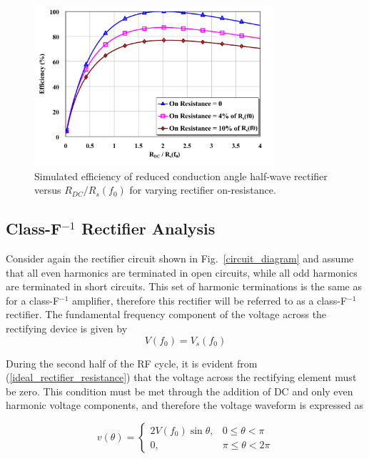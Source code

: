 \documentclass[journal]{IEEEtran}
\begin{document}
\begin{figure}
  \begin{center}
  \includegraphics[width=3.5in]{pdf/03.pdf}
  \caption{Simulated efficiency of reduced conduction angle half-wave rectifier versus $R_{DC} / R_s(f_0)$ for varying rectifier on-resistance.}\label{sim_opt_eff}
  \end{center}
\end{figure}










\subsection {Class-F$^{-1}$ Rectifier Analysis}

Consider again the rectifier circuit shown in Fig.~\ref{circuit_diagram} and assume that all even harmonics are terminated in open circuits, while all odd harmonics are terminated in short circuits. This set of harmonic terminations is the same as for a class-F$^{-1}$ amplifier, therefore this rectifier will be referred to as a class-F$^{-1}$ rectifier. The fundamental frequency component of the voltage across the rectifying device is given by
\begin{equation}\label{fundamental_diode_voltage}
    V(f_0) = V_s(f_0)
\end{equation}

During the second half of the RF cycle, it is evident from (\ref{ideal_rectifier_resistance}) that the voltage across the rectifying element must be zero.  This condition must be met through the addition of DC and only even harmonic voltage components, and therefore the voltage waveform is expressed as

\begin{equation}\label{diode_voltage_waveform_finv}
v(\theta) =
\begin{cases}
    2V(f_0)\sin\theta, & 0 \leq \theta < \pi\\
    0, & \pi \leq \theta < 2\pi
\end{cases}
\end{equation}
\end{document}
